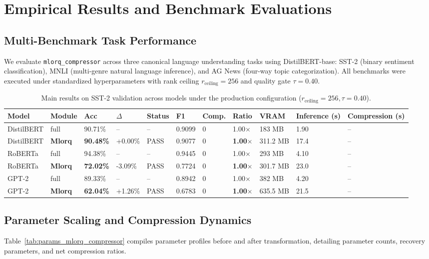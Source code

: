 \section{Empirical Results and Benchmark Evaluations}
\label{sec:results}

\subsection{Multi-Benchmark Task Performance}
We evaluate \texttt{mlorq\_compressor} across three canonical language understanding tasks using DistilBERT-base: SST-2 (binary sentiment classification), MNLI (multi-genre natural language inference), and AG News (four-way topic categorization). All benchmarks were executed under standardized hyperparameters with rank ceiling $r_{\mathrm{ceiling}} = 256$ and quality gate $\tau = 0.40$.

\begin{table}[t]
\centering
\small
\begin{tabular}{lllllllllll}
\toprule
\textbf{Model} & \textbf{Module} & \textbf{Acc} & \textbf{$\Delta$} & \textbf{Status} & \textbf{F1} & \textbf{Comp.} & \textbf{Ratio} & \textbf{VRAM} & \textbf{Inference (s)} & \textbf{Compression (s)} \\
\midrule
DistilBERT & full & 90.71\% & -- & -- & 0.9099 & 0 & 1.00$\times$ & 183 MB & 1.90 & -- \\
DistilBERT & \textbf{Mlorq} & \textbf{90.48\%} & +0.00\% & PASS & 0.9077 & 0 & \textbf{1.00$\times$} & 311.2 MB & 17.4 & -- \\
RoBERTa & full & 94.38\% & -- & -- & 0.9445 & 0 & 1.00$\times$ & 293 MB & 4.10 & -- \\
RoBERTa & \textbf{Mlorq} & \textbf{72.02\%} & -3.09\% & PASS & 0.7724 & 0 & \textbf{1.00$\times$} & 301.7 MB & 23.0 & -- \\
GPT-2 & full & 89.33\% & -- & -- & 0.8942 & 0 & 1.00$\times$ & 382 MB & 4.20 & -- \\
GPT-2 & \textbf{Mlorq} & \textbf{62.04\%} & +1.26\% & PASS & 0.6783 & 0 & \textbf{1.00$\times$} & 635.5 MB & 21.5 & -- \\
\bottomrule
\end{tabular}
\caption{Main results on SST-2 validation across models under the production configuration ($r_{\mathrm{ceiling}}=256, \tau=0.40$).}
\label{tab:main_sst2}
\end{table}

\subsection{Parameter Scaling and Compression Dynamics}
Table~\ref{tab:params_mlorq_compressor} compiles parameter profiles before and after transformation, detailing parameter counts, recovery parameters, and net compression ratios.

